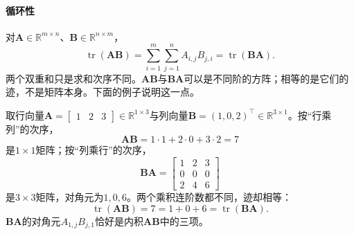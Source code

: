 \paragraph{循环性}
对$\bm A\in\mathbb R^{m\times n}$、$\bm B\in\mathbb R^{n\times m}$，
\begin{equation}
 \operatorname{tr}(\bm A\bm B)
 =\sum_{i=1}^m\sum_{j=1}^n A_{i,j}B_{j,i}
 =\operatorname{tr}(\bm B\bm A).
 \label{eq:linear-algebra-trace-cyclic}
\end{equation}
两个双重和只是求和次序不同。$\bm A\bm B$与$\bm B\bm A$可以是不同阶的方阵；相等的是它们的迹，不是矩阵本身。下面的例子说明这一点。
\begin{example}[不同阶乘积的迹相等]
\label{ex:ls-trace-cyclic-different-sizes}
取行向量$\bm A=\left[\begin{smallmatrix}1&2&3\end{smallmatrix}\right]\in\mathbb R^{1\times3}$与列向量$\bm B=(1,0,2)^\top\in\mathbb R^{3\times1}$。按“行乘列”的次序，
\[
 \bm A\bm B=1\cdot1+2\cdot0+3\cdot2=7
\]
是$1\times1$矩阵；按“列乘行”的次序，
\[
 \bm B\bm A=\begin{bmatrix}1&2&3\\0&0&0\\2&4&6\end{bmatrix}
\]
是$3\times3$矩阵，对角元为$1,0,6$。两个乘积连阶数都不同，迹却相等：
\[
 \operatorname{tr}(\bm A\bm B)=7=1+0+6=\operatorname{tr}(\bm B\bm A).
\]
$\bm B\bm A$的对角元$A_{1,j}B_{j,1}$恰好是内积$\bm A\bm B$中的三项。
\end{example}

